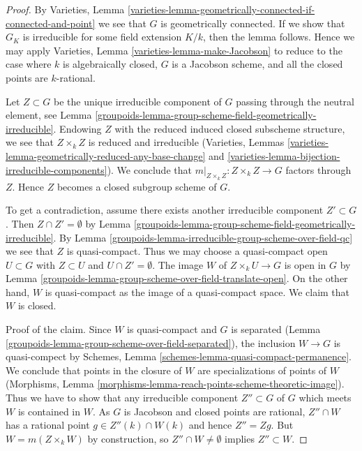 \begin{proof}

By Varieties, Lemma
\ref{varieties-lemma-geometrically-connected-if-connected-and-point}
we see that $G$ is geometrically connected. If we show that $G_K$
is irreducible for some field extension $K/k$, then
the lemma follows. Hence we may apply
Varieties, Lemma \ref{varieties-lemma-make-Jacobson}
to reduce to the case where $k$ is algebraically closed,
$G$ is a Jacobson scheme, and all the closed points are $k$-rational.

\medskip\noindent
Let $Z \subset G$ be the unique irreducible component of $G$ passing
through the neutral element, see
Lemma \ref{groupoids-lemma-group-scheme-field-geometrically-irreducible}.
Endowing $Z$ with the reduced induced closed subscheme structure,
we see that $Z \times_k Z$ is reduced and irreducible
(Varieties, Lemmas
\ref{varieties-lemma-geometrically-reduced-any-base-change} and
\ref{varieties-lemma-bijection-irreducible-components}).
We conclude that $m|_{Z \times_k Z} : Z \times_k Z \to G$ factors
through $Z$. Hence $Z$ becomes a closed subgroup scheme of $G$.

\medskip\noindent
To get a contradiction, assume there exists another irreducible
component $Z' \subset G$. Then $Z \cap Z' = \emptyset$ by
Lemma \ref{groupoids-lemma-group-scheme-field-geometrically-irreducible}.
By Lemma \ref{groupoids-lemma-irreducible-group-scheme-over-field-qc}
we see that $Z$ is quasi-compact. Thus we may choose a quasi-compact open
$U \subset G$ with $Z \subset U$ and $U \cap Z' = \emptyset$.
The image $W$ of $Z \times_k U \to G$ is open in $G$ by
Lemma \ref{groupoids-lemma-group-scheme-over-field-translate-open}.
On the other hand, $W$ is quasi-compact as the image of a
quasi-compact space. We claim that $W$ is closed.

\medskip\noindent
Proof of the claim. Since $W$ is quasi-compact and $G$ is separated
(Lemma \ref{groupoids-lemma-group-scheme-over-field-separated}), the inclusion
$W \to G$ is quasi-compect by Schemes, Lemma
\ref{schemes-lemma-quasi-compact-permanence}. We conclude that
points in the closure of $W$ are specializations of points of $W$
(Morphisms, Lemma \ref{morphisms-lemma-reach-points-scheme-theoretic-image}).
Thus we have to show that any irreducible
component $Z'' \subset G$ of $G$ which meets $W$ is contained in $W$.
As $G$ is Jacobson and closed points are rational,
$Z'' \cap W$ has a rational point
$g \in Z''(k) \cap W(k)$ and hence $Z'' = Zg$. But $W = m(Z \times_k W)$
by construction, so $Z'' \cap W \not = \emptyset$ implies
$Z'' \subset W$.


\end{proof}
